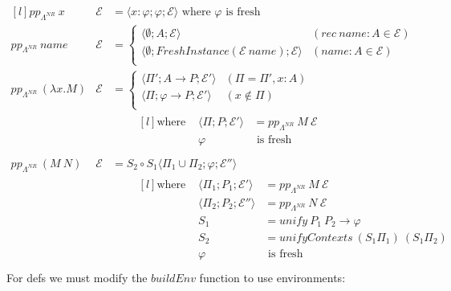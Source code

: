 \[\begin{matrix*}[l]
		pp_{\Lambda^{NR}} \ x & \mathcal{E} & = \langle x: \varphi ; \varphi ; \mathcal{E} \rangle \text{ where } \varphi \text{ is fresh} \\

		pp_{\Lambda^{NR}} \ name & \mathcal{E} & = \begin{cases}
			\langle \emptyset ; A ; \mathcal{E} \rangle                                  & (rec \ name : A \in \mathcal{E} ) \\
			\langle \emptyset ; FreshInstance(\mathcal{E} \ name) ; \mathcal{E}  \rangle & (name : A \in \mathcal{E})        \\
		\end{cases} \\
		pp_{\Lambda^{NR}} \ (\lambda x . M) & \mathcal{E} & = \begin{cases}
			\langle \Pi'; A \to P ; \mathcal{E}' \rangle      & (\Pi = \Pi', x:A) \\
			\langle \Pi; \varphi \to P ; \mathcal{E}' \rangle & (x \not\in \Pi)   \\
		\end{cases} \\
		& & \qquad \begin{matrix*}[l]
			\text{where } & \langle \Pi; P ; \mathcal{E}' \rangle & = pp_{\Lambda^{NR}} \ M \ \mathcal{E} \\
			& \varphi & \text{ is fresh} \\
		\end{matrix*} \\
		pp_{\Lambda^{NR}} \ (M \ N) & \mathcal{E} & = S_2 \circ S_1 \langle \Pi_1 \cup \Pi_2 ; \varphi ; \mathcal{E}'' \rangle \\
		& & \qquad \begin{matrix*}[l]
			\text{where } & \langle \Pi_1 ; P_1 ; \mathcal{E}' \rangle & = pp_{\Lambda^{NR}} \ M \ \mathcal{E} \\
			& \langle \Pi_2 ; P_2 ; \mathcal{E}'' \rangle & = pp_{\Lambda^{NR}} \ N \ \mathcal{E} \\
			& S_1 & = unify \ P_1 \ P_2 \to \varphi \\
			& S_2 & = unifyContexts \ (S_1 \Pi_1) \ (S_1 \Pi_2) \\
			& \varphi & \text{ is fresh} \\
		\end{matrix*}
	\end{matrix*}\]
For defs we must modify the $buildEnv$ function to use environments:
